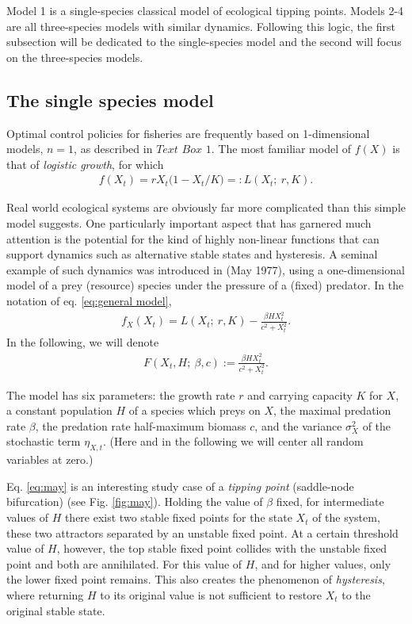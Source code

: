 \documentclass{article}
\begin{document}
Model 1 is a single-species classical model of ecological tipping
points. Models 2-4 are all three-species models with similar dynamics.
Following this logic, the first subsection will be dedicated to the
single-species model and the second will focus on the three-species
models.

\hypertarget{the-single-species-model}{%
\subsection{The single species model}\label{the-single-species-model}}

Optimal control policies for fisheries are frequently based on
1-dimensional models, \(n=1\), as described in \(Text\) \(Box\) \(1\).
The most familiar model of \(f(X)\) is that of \emph{logistic growth},
for which \begin{align}
  \label{eq:logistic}
  f(X_t) = r X_t\big(1 - X_t / K \big) =: L(X_t;\ r, K).
\end{align}

Real world ecological systems are obviously far more complicated than
this simple model suggests. One particularly important aspect that has
garnered much attention is the potential for the kind of highly
non-linear functions that can support dynamics such as alternative
stable states and hysteresis. A seminal example of such dynamics was
introduced in (May 1977), using a one-dimensional model of a prey
(resource) species under the pressure of a (fixed) predator. In the
notation of eq. \eqref{eq:general model}, \begin{align}
  \label{eq:may}
  f_X(X_t)
  = L(X_t;\ r, K) - \frac{\beta H X_t^2}{c^2 + X_t^2}.
\end{align} In the following, we will denote \begin{align*}
  F(X_t,H;\ \beta,c) := \frac{\beta H X_t^2}{c^2 + X_t^2}.
\end{align*}

The model has six parameters: the growth rate \(r\) and carrying
capacity \(K\) for \(X\), a constant population \(H\) of a species which
preys on \(X\), the maximal predation rate \(\beta\), the predation rate
half-maximum biomass \(c\), and the variance \(\sigma_X^2\) of the
stochastic term \(\eta_{X,t}\). (Here and in the following we will
center all random variables at zero.)

Eq. \eqref{eq:may} is an interesting study case of a \emph{tipping
point} (saddle-node bifurcation) (see Fig. \ref{fig:may}). Holding the
value of \(\beta\) fixed, for intermediate values of \(H\) there exist
two stable fixed points for the state \(X_t\) of the system, these two
attractors separated by an unstable fixed point. At a certain threshold
value of \(H\), however, the top stable fixed point collides with the
unstable fixed point and both are annihilated. For this value of \(H\),
and for higher values, only the lower fixed point remains. This also
creates the phenomenon of \emph{hysteresis}, where returning \(H\) to
its original value is not sufficient to restore \(X_t\) to the original
stable state.
\end{document}

